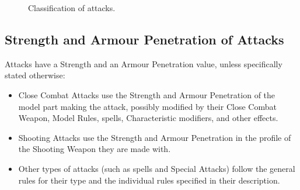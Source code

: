\newcommand{\figATTAttacks}{Attacks}
\newcommand{\figATTMeleeAttacks}{\begin{minipage}{0.17\unitlength}\begin{center}%
Melee Attacks%
\end{center}\end{minipage}}
\newcommand{\figATTRangedAttacks}{\begin{minipage}{0.17\unitlength}\begin{center}%
Ranged Attacks%
\end{center}\end{minipage}}
\newcommand{\figATTCCAttacks}{\begin{minipage}{0.2\unitlength}\begin{center}%
Close Combat Attacks%
\end{center}\end{minipage}}
\newcommand{\figATTSpeMeleeAttacks}{\begin{minipage}{0.2\unitlength}\begin{center}%
Special Attacks%
\end{center}\end{minipage}}
\newcommand{\figATTShootingAttacks}{\begin{minipage}{0.15\unitlength}\begin{center}%
Shooting Attacks%
\end{center}\end{minipage}}
\newcommand{\figATTOthers}{Others}

\begin{figure}[!htbp]
\centering
\def\svgwidth{0.8\textwidth}

\caption{Classification of attacks.}
\label{figure/attacks}
\end{figure}

\subsection{Strength and Armour Penetration of Attacks}

Attacks have a Strength and an Armour Penetration value, unless specifically stated otherwise:
\begin{itemize}
\item Close Combat Attacks use the Strength and Armour Penetration of the model part making the attack, possibly modified by their Close Combat Weapon, Model Rules, spells, Characteristic modifiers, and other effects.
\item Shooting Attacks use the Strength and Armour Penetration in the profile of the Shooting Weapon they are made with.
\item Other types of attacks (such as spells and Special Attacks) follow the general rules for their type and the individual rules specified in their description.
\end{itemize}

